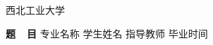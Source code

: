 \begin{titlepage}
    \voffset 2.1cm
    \begin{center}
        \begin{center}
            \begin{minipage}[c]{2.64cm}
                \centering
                \resizebox{!}{0.9cm}{ \parbox{0.54cm}{  } }
                \end{minipage}
                \hskip 0.8cm
                \begin{minipage}[c]{8cm}
                \fontsize{33}{33}\fNWPU 西北工业大学
            \end{minipage}
        \end{center}
        \vskip 0.7cm
        \sChuhao{}%
        \vskip 4cm
        {
        \sSanhao\fHei \textbf{ 题~~目}  \hspace{0.2cm}
        }
        \vskip 1.7cm
        {
            \sSihao\fSong 专业名称\coverunderline[5.5cm]{}%
            \vskip 0.9cm
            \sSihao\fSong 学生姓名\coverunderline[5.5cm]{}%
            \vskip 0.9cm
            \sSihao\fSong 指导教师\coverunderline[5.5cm]{}%
            \vskip 0.9cm
            \sSihao\fSong 毕业时间\coverunderline[5.5cm]{}%
            \vfill
        }
    \end{center}
\end{titlepage}
\fSong \normalsize

\endinput
